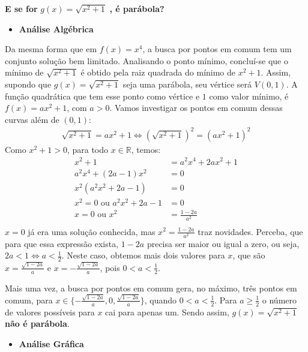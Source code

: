 \textbf{E se for} \(g(x) = \sqrt{x^2+1}\) \textbf{, é parábola?}
\begin{itemize}
\item {} 
\textbf{Análise Algébrica}

\end{itemize}

Da mesma forma que em \(f(x)=x^4\), a busca por pontos em comum tem um conjunto solução bem limitado. Analisando o ponto mínimo, concluí-se que o mínimo de \(\sqrt{x^2+1}\) é obtido pela raiz quadrada do mínimo de \(x^2+1\). Assim, supondo que \(g(x) = \sqrt{x^2+1}\) seja uma parábola, seu vértice será \(V(0,1)\). A função quadrática que tem esse ponto como vértice e \(1\) como valor mínimo, é \(f(x)=ax^2+1\), com \(a>0\). Vamos investigar os pontos em comum dessas curvas além de \((0,1)\):
\begin{equation*}
\begin{split}\sqrt{x^2+1} = ax^2+1 \Leftrightarrow (\sqrt{x^2+1})^2 = (ax^2+1)^2\end{split}
\end{equation*}
Como \(x^2+1>0\), para todo \(x \in \mathbb{R}\), temos:
\begin{equation*}
\begin{split}x^2+1 & =a^2x^4+2ax^2+1 \\
a^2x^4+(2a-1)x^2 & =0 \\
x^2(a^2x^2+2a-1) & =0 \\
x^2=0 \text{ ou } a^2x^2+2a-1 & = 0 \\
x=0 \text{ ou } x^2 & = \frac{1-2a}{a^2} \\\end{split}
\end{equation*}
\(x=0\) já era uma solução conhecida, mas \(x^2 = \frac{1-2a}{a^2}\) traz novidades. Perceba, que para que essa expressão exista, \(1-2a\) precisa ser maior ou igual a zero, ou seja, \(2a<1 \Leftrightarrow a< \frac{1}{2}\). Neste caso, obtemos mais dois valores para \(x\), que são \(\displaystyle x=\frac{\sqrt{1-2a}}{a}\) e \(\displaystyle x=- \frac{\sqrt{1-2a}}{a}\), pois \(0<a<\frac{1}{2}\).

Mais uma vez, a busca por pontos em comum gera, no máximo, três pontos em comum, para \(\displaystyle x \in \{- \frac{\sqrt{1-2a}}{a},0,\frac{\sqrt{1-2a}}{a} \}\), quando \(\displaystyle0<a<\frac{1}{2}\). Para \(\displaystyle a \geq \frac{1}{2}\) o número de valores possíveis para \(x\) cai para apenas um. Sendo assim, \(g(x) = \sqrt{x^2+1}\) \textbf{não é parábola}.
\begin{itemize}
\item {} 
\textbf{Análise Gráfica}

\end{itemize}

